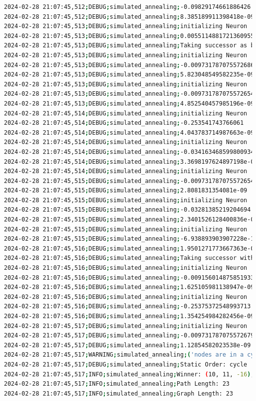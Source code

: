 \documentclass{article}
\begin{document}
\begin{lstlisting}[language=bash, caption=Example Output of Program]
2024-02-28 21:07:45,512;DEBUG;simulated_annealing;-0.09829174661886426
2024-02-28 21:07:45,512;DEBUG;simulated_annealing;8.385189911398418e-09
2024-02-28 21:07:45,513;DEBUG;simulated_annealing;initializing Neuron
2024-02-28 21:07:45,513;DEBUG;simulated_annealing;0.0055114881721360955
2024-02-28 21:07:45,513;DEBUG;simulated_annealing;Taking successor as better option (exploitation)
2024-02-28 21:07:45,513;DEBUG;simulated_annealing;initializing Neuron
2024-02-28 21:07:45,513;DEBUG;simulated_annealing;-0.009731787075572686
2024-02-28 21:07:45,513;DEBUG;simulated_annealing;5.823048549582235e-09
2024-02-28 21:07:45,513;DEBUG;simulated_annealing;initializing Neuron
2024-02-28 21:07:45,513;DEBUG;simulated_annealing;-0.009731787075572654
2024-02-28 21:07:45,513;DEBUG;simulated_annealing;4.852540457985196e-09
2024-02-28 21:07:45,514;DEBUG;simulated_annealing;initializing Neuron
2024-02-28 21:07:45,514;DEBUG;simulated_annealing;-0.253541743766061
2024-02-28 21:07:45,514;DEBUG;simulated_annealing;4.043783714987663e-09
2024-02-28 21:07:45,514;DEBUG;simulated_annealing;initializing Neuron
2024-02-28 21:07:45,514;DEBUG;simulated_annealing;-0.034163468599800934
2024-02-28 21:07:45,514;DEBUG;simulated_annealing;3.3698197624897198e-09
2024-02-28 21:07:45,514;DEBUG;simulated_annealing;initializing Neuron
2024-02-28 21:07:45,515;DEBUG;simulated_annealing;-0.009731787075572654
2024-02-28 21:07:45,515;DEBUG;simulated_annealing;2.8081831354081e-09
2024-02-28 21:07:45,515;DEBUG;simulated_annealing;initializing Neuron
2024-02-28 21:07:45,515;DEBUG;simulated_annealing;-0.03281385219204694
2024-02-28 21:07:45,515;DEBUG;simulated_annealing;2.3401526128400836e-09
2024-02-28 21:07:45,515;DEBUG;simulated_annealing;initializing Neuron
2024-02-28 21:07:45,515;DEBUG;simulated_annealing;-6.938893903907228e-18
2024-02-28 21:07:45,516;DEBUG;simulated_annealing;1.9501271773667363e-09
2024-02-28 21:07:45,516;DEBUG;simulated_annealing;Taking successor with probability 99% (exploration)
2024-02-28 21:07:45,516;DEBUG;simulated_annealing;initializing Neuron
2024-02-28 21:07:45,516;DEBUG;simulated_annealing;-0.009156014875851933
2024-02-28 21:07:45,516;DEBUG;simulated_annealing;1.625105981138947e-09
2024-02-28 21:07:45,516;DEBUG;simulated_annealing;initializing Neuron
2024-02-28 21:07:45,516;DEBUG;simulated_annealing;-0.25375372548993713
2024-02-28 21:07:45,516;DEBUG;simulated_annealing;1.354254984282456e-09
2024-02-28 21:07:45,517;DEBUG;simulated_annealing;initializing Neuron
2024-02-28 21:07:45,517;DEBUG;simulated_annealing;-0.009731787075572679
2024-02-28 21:07:45,517;DEBUG;simulated_annealing;1.12854582023538e-09
2024-02-28 21:07:45,517;WARNING;simulated_annealing;('nodes are in a cycle', [(2, 1, -3), err=0.936, (2, 1, -3), err=0.936])
2024-02-28 21:07:45,517;DEBUG;simulated_annealing;Static Order: cycle
2024-02-28 21:07:45,517;INFO;simulated_annealing;Winner: (10, 11, -16), err=0.016
2024-02-28 21:07:45,517;INFO;simulated_annealing;Path Length: 23
2024-02-28 21:07:45,517;INFO;simulated_annealing;Graph Length: 23
\end{lstlisting}
\end{document}
